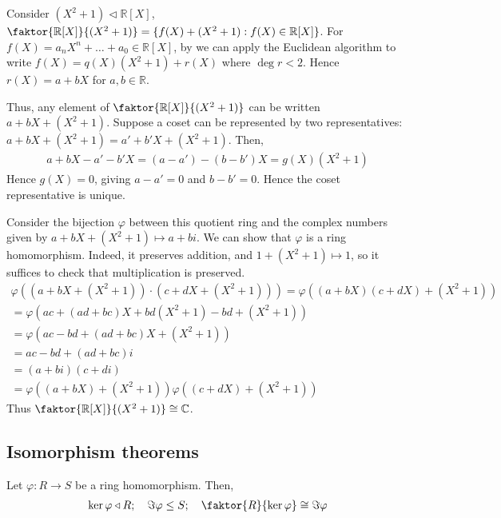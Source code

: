 \begin{example}
	Consider $(X^2 + 1) \triangleleft \mathbb R[X]$, $\faktor{\mathbb{R}[X]}{(X^2 + 1)} = \{f(X) + (X^2 + 1) : f(X) \in \mathbb{R}[X]\}$.
	For $f(X) = a_n X^n + \dots + a_0 \in \mathbb R[X]$, by  we can apply the Euclidean algorithm to write $f(X) = q(X) (X^2 + 1) + r(X)$ where $\deg r < 2$.
	Hence $r(X) = a+bX$ for $a, b \in \mathbb{R}$. 

	Thus, any element of $\faktor{\mathbb R[X]}{(X^2 + 1)}$ can be written $a+bX + (X^2 + 1)$.
	Suppose a coset can be represented by two representatives: $a+bX + (X^2+1) = a' + b'X + (X^2 + 1)$.
	Then,
	\begin{align*}
		a+bX - a' - b'X = (a-a') - (b-b')X = g(X) (X^2 + 1)
	\end{align*}
	Hence $g(X) = 0$, giving $a-a' = 0$ and $b-b' = 0$.
	Hence the coset representative is unique.

	Consider the bijection $\varphi$ between this quotient ring and the complex numbers given by $a+bX + (X^2 + 1) \mapsto a+bi$.
	We can show that $\varphi$ is a ring homomorphism.
	Indeed, it preserves addition, and $1 + (X^2 + 1) \mapsto 1$, so it suffices to check that multiplication is preserved.
	\begin{gather*}
		\varphi((a+bX + (X^2 + 1)) \cdot (c+dX + (X^2 + 1))) = \varphi((a+bX)(c+dX) + (X^2 + 1)) \\
		= \varphi(ac + (ad + bc)X + bd (X^2 + 1) - bd + (X^2 + 1)) \\
		= \varphi(ac-bd+(ad+bc)X + (X^2 + 1))\\
		= ac - bd + (ad + bc)i \\
		= (a+bi)(c+di) \\
		= \varphi((a+bX) + (X^2 + 1)) \varphi((c+dX) + (X^2 + 1))
	\end{gather*}
	Thus $\faktor{\mathbb R[X]}{(X^2 + 1)} \cong \mathbb C$.
\end{example}

\subsection{Isomorphism theorems}
\begin{theorem}
	Let $\varphi : R \to S$ be a ring homomorphism.
	Then,
	\begin{align*}
		\ker \varphi \triangleleft R;\quad \Im \varphi \leq S;\quad \faktor{R}{\ker \varphi} \cong \Im \varphi
	\end{align*}
\end{theorem}


